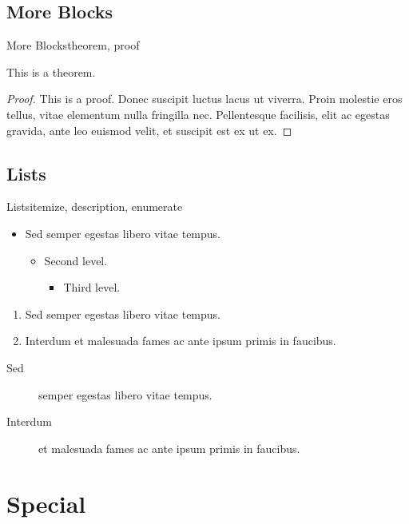 \documentclass{beamer}
\begin{document}
\subsection{More Blocks}
\begin{frame}{More Blocks}{theorem, proof}
  \begin{theorem}
    This is a theorem.
  \end{theorem}
  \begin{proof}
    This is a proof.  Donec suscipit luctus lacus ut viverra. Proin molestie
    eros tellus, vitae elementum nulla fringilla nec. Pellentesque facilisis,
    elit ac egestas gravida, ante leo euismod velit, et suscipit est ex ut ex.
  \end{proof}
\end{frame}

\subsection{Lists}
\begin{frame}{Lists}{itemize, description, enumerate}
  \begin{itemize}
  \item Sed semper egestas libero vitae tempus.
    \begin{itemize}
    \item Second level.
      \begin{itemize}
      \item Third level.
      \end{itemize}
    \end{itemize}
  \end{itemize}

  \begin{enumerate}
  \item Sed semper egestas libero vitae tempus.
  \item Interdum et malesuada fames ac ante ipsum primis in faucibus.
  \end{enumerate}

  \begin{description}
  \item[Sed] semper egestas libero vitae tempus.
  \item[Interdum] et malesuada fames ac ante ipsum primis in faucibus.
  \end{description}
\end{frame}

\section{Special}
\end{document}
